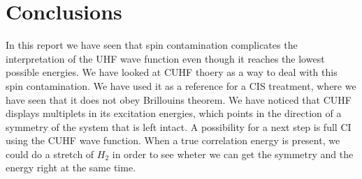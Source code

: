 \documentclass[twoside,twocolumn,9pt]{article}
\renewcommand{\refname}{Notes and references}
\begin{document}
\section{Conclusions}
In this report we have seen that spin contamination complicates the interpretation of the UHF wave function even though it reaches the lowest possible energies. We have looked at 
CUHF thoery as a way to deal with this spin contamination. We have used it as a reference for a CIS treatment, where we have seen that it does not obey Brillouins theorem.
We have noticed that CUHF displays multiplets in its excitation energies, which points in the direction of a symmetry of the system that is left intact. A possibility for a 
next step is full CI using the CUHF wave function. When a true correlation energy is present, we could do a stretch of $H_2$ in order to see wheter we can get the symmetry and 
the energy right at the same time.





\balance


\end{document}
